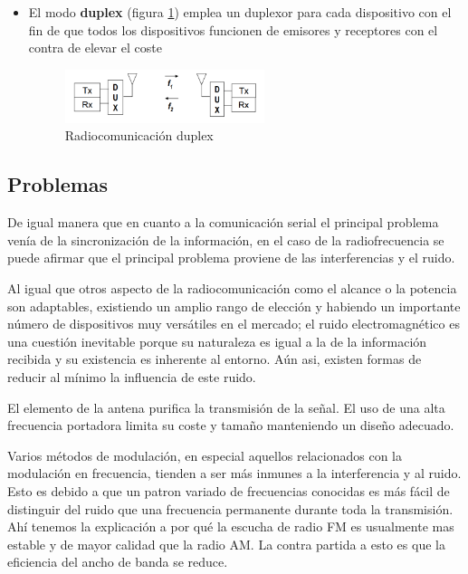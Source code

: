 \begin{itemize}
\item El modo \textbf{duplex}  (figura \ref{fig:duplex}) emplea un duplexor para cada dispositivo con el fin de que todos los dispositivos funcionen de emisores y receptores con el contra de elevar el coste

\begin{figure}[H]
\centering
\includegraphics[width=0.55\textwidth]{figuras/RadioDuplex.png}
\caption{Radiocomunicación duplex}
\label{fig:duplex}
\end{figure}
\end{itemize}

\subsection{Problemas}

De igual manera que en cuanto a la comunicación serial el principal problema venía de la sincronización de la información, en el caso de la radiofrecuencia se puede afirmar que el principal problema proviene de las interferencias y el ruido.

Al igual que otros aspecto de la radiocomunicación como el alcance o la potencia son adaptables, existiendo un amplio rango de elección y habiendo un importante número de dispositivos muy versátiles en el mercado; el ruido electromagnético es una cuestión inevitable porque su naturaleza es igual a la de la información recibida y su existencia es inherente al entorno. Aún asi, existen formas de reducir al mínimo la influencia de este ruido.

El elemento de la antena purifica la transmisión de la señal. El uso de una alta frecuencia portadora limita su coste y tamaño manteniendo un diseño adecuado.

Varios métodos de modulación, en especial aquellos relacionados con la modulación en frecuencia, tienden a ser más inmunes a la interferencia y al ruido. Esto es debido a que un patron variado de frecuencias conocidas es más fácil de distinguir del ruido que una frecuencia permanente durante toda la transmisión. Ahí tenemos la explicación a por qué la escucha de radio FM es usualmente mas estable y de mayor calidad que la radio AM. La contra partida a esto es que la eficiencia del ancho de banda se reduce.

